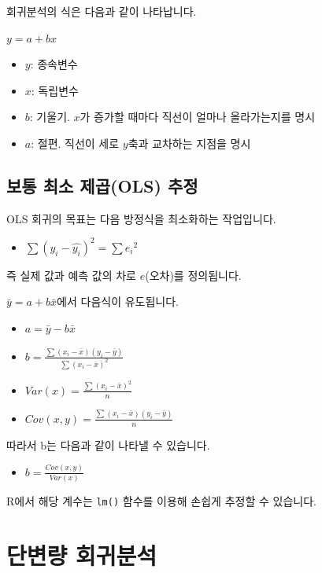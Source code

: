 \documentclass[12pt,]{book}
\providecommand{\tightlist}{%
  \setlength{\itemsep}{0pt}\setlength{\parskip}{0pt}}
\begin{document}
회귀분석의 식은 다음과 같이 나타납니다.

\(y = a + bx\)

\begin{itemize}
\tightlist
\item
  \(y\): 종속변수
\item
  \(x\): 독립변수
\item
  \(b\): 기울기. \(x\)가 증가할 때마다 직선이 얼마나 올라가는지를 명시
\item
  \(a\): 절편. 직선이 세로 \(y\)축과 교차하는 지점을 명시
\end{itemize}

\hypertarget{uxbcf4uxd1b5-uxcd5cuxc18c-uxc81cuxacf1ols-uxcd94uxc815}{%
\subsection{보통 최소 제곱(OLS) 추정}\label{uxbcf4uxd1b5-uxcd5cuxc18c-uxc81cuxacf1ols-uxcd94uxc815}}

OLS 회귀의 목표는 다음 방정식을 최소화하는 작업입니다.

\begin{itemize}
\tightlist
\item
  \(\sum(y_i - \hat{y_i})^2 = \sum{e_i}^2\)
\end{itemize}

즉 실제 값과 예측 값의 차로 \(e\)(오차)를 정의됩니다.

\(\bar{y} = a + b\bar{x}\)에서 다음식이 유도됩니다.

\begin{itemize}
\tightlist
\item
  \(a = \bar{y} - b\bar{x}\)
\item
  \(b = \frac{\sum(x_i - \bar{x})(y_i - \bar{y})}{\sum(x_i - \bar{x})^2}\)
\item
  \(Var(x) = \frac{\sum(x_i - \bar{x})^2}{n}\)
\item
  \(Cov(x,y) = \frac{\sum(x_i - \bar{x})(y_i - \bar{y})}{n}\)
\end{itemize}

따라서 b는 다음과 같이 나타낼 수 있습니다.

\begin{itemize}
\tightlist
\item
  \(b = \frac{Cov(x,y)}{Var(x)}\)
\end{itemize}

R에서 해당 계수는 \texttt{lm()} 함수를 이용해 손쉽게 추정할 수 있습니다.

\hypertarget{uxb2e8uxbcc0uxb7c9-uxd68cuxadc0uxbd84uxc11d}{%
\section{단변량 회귀분석}\label{uxb2e8uxbcc0uxb7c9-uxd68cuxadc0uxbd84uxc11d}}
\end{document}
